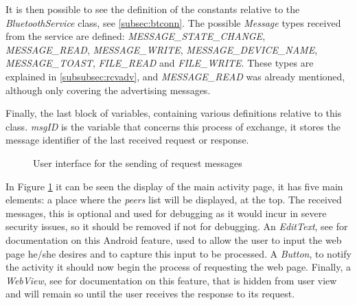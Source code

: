 It is then possible to see the definition of the constants relative to the \textit{BluetoothService} class, see \ref{subsec:btconn}. The possible \textit{Message} types received from the service are defined: \textit{MESSAGE\_STATE\_CHANGE}, \textit{MESSAGE\_READ}, \textit{MESSAGE\_WRITE}, \textit{MESSAGE\_DEVICE\_NAME}, \textit{MESSAGE\_TOAST}, \textit{FILE\_READ} and \textit{FILE\_WRITE}. These types are explained in \ref{subsubsec:rcvadv}, and \textit{MESSAGE\_READ} was already mentioned, although only covering the advertising messages.

Finally, the last block of variables, containing various definitions relative to this class. \textit{msgID} is the variable that concerns this process of exchange, it stores the message identifier of the last received request or response.

\begin{figure}[ht]
   \noindent{}
	\caption{\label{fig:initScreen} User interface for the sending of request messages}
\end{figure}

In Figure \ref{fig:initScreen} it can be seen the display of the main activity page, it has five main elements: a place where the \textit{peers} list will be displayed, at the top. The received messages, this is optional and used for debugging as it would incur in severe security issues, so it should be removed if not for debugging. An \textit{EditText}, see \cite{edittext} for documentation on this Android feature, used to allow the user to input the web page he/she desires and to capture this input to be processed. A \textit{Button}, to notify the activity it should now begin the process of requesting the web page. Finally, a \textit{WebView}, see \cite{webview} for documentation on this feature, that is hidden from user view and will remain so until the user receives the response to its request.

